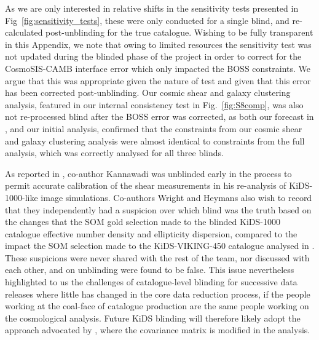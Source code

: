 \begin{appendix}
As we are only interested in relative shifts in the sensitivity tests presented in Fig~\ref{fig:sensitivity_tests}, these were only conducted for a single blind, and re-calculated post-unblinding for the true catalogue.  Wishing to be fully transparent in this Appendix, we note that owing to limited resources the sensitivity test was not updated during the blinded phase of the project in order to correct for the {\sc CosmoSIS-CAMB} interface error which only impacted the BOSS constraints.   We argue that this was appropriate given the nature of test and given that this error has been corrected post-unblinding.    Our cosmic shear and galaxy clustering analysis, featured in our internal consistency test in Fig.~\ref{fig:S8comp}, was also not re-processed blind after the BOSS error was corrected, as both our forecast in \citet{joachimi/etal:inprep}, and our initial analysis, confirmed that the constraints from our cosmic shear and galaxy clustering analysis were almost identical to constraints from the full \tttp analysis, which was correctly analysed for all three blinds.

As reported in \citet{giblin/etal:inprep}, co-author Kannawadi was unblinded early in the process to permit accurate calibration of the shear measurements in his re-analysis of KiDS-1000-like image simulations.   Co-authors Wright and Heymans also wish to record that they independently had a suspicion over which blind was the truth based on the changes that the SOM gold selection made to the blinded KiDS-1000 catalogue effective number density and ellipticity dispersion, compared to the impact the SOM selection made to the KiDS-VIKING-450 catalogue analysed in \citet{wright/etal:2020b}.  These suspicions were never shared with the rest of the team, nor discussed with each other, and on unblinding were found to be false.   This issue nevertheless highlighted to us the challenges of catalogue-level blinding for successive data releases where little has changed in the core data reduction process, if the people working at the coal-face of catalogue production are the same people working on the cosmological analysis.   Future KiDS blinding will therefore likely adopt the approach advocated by \citet{sellentin:2020}, where the covariance matrix is modified in the analysis.


\end{appendix}